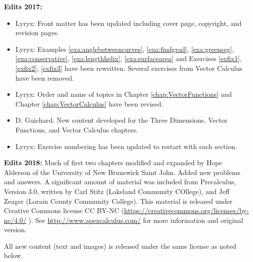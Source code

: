 \noindent \textbf{Edits 2017:}
\begin{itemize} 
   \item Lyryx: Front matter has been updated including cover page, copyright, and revision pages. 
   \item Lyryx: Examples \ref{exa:anglebetweencurves}, \ref{exa:findgrad}, \ref{exa:greenseg}, \ref{exa:conservative}, \ref{exa:lengthhelix}, \ref{exa:surfacearea}  and Exercises \ref{exfix1}, \ref{exfix2}, \ref{exfix3} have been rewritten. Several exercises from Vector Calculus have been removed.  
   \item Lyryx: Order and name of topics in Chapter \ref{chap:VectorFunctions} and Chapter \ref{chap:VectorCalculus} have been revised. 
   \item D. Guichard: New content developed for the Three Dimensions, Vector Functions, and Vector Calculus chapters.  
   \item Lyryx: Exercise numbering has been updated to restart with each section.  %
 \end{itemize} 

\noindent \textbf{Edits 2018:} Much of first two chapters modified and expanded by Hope Alderson of the University of New Brunswick Saint John. Added new problems and answers. A significant amount of material %
was included from Precalculus, Version 3.0, written by Carl Stitz (Lakeland Community COllege), and Jeff Zeager (Lorain County Community College). This material is released under Creative Commons license CC BY-NC (\url{https://creativecommons.org/licenses/by-nc/4.0/} ). See \url{http://www.apexcalculus.com/} for more information and original version.\\ 
\bigskip

\noindent All new content (text and images) is released under the same license as noted below.

